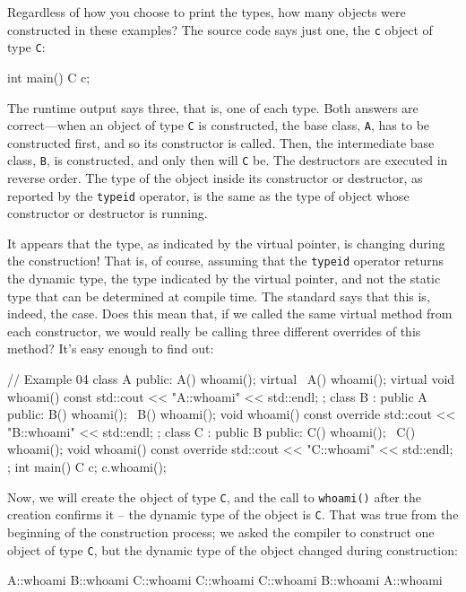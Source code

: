 Regardless of how you choose to print the types, how many objects were constructed in these examples? The source code says just one, the \texttt{c} object of type \texttt{C}:

\begin{code}
int main() {
  C c;
}
\end{code}

The runtime output says three, that is, one of each type. Both answers are correct---when an object of type \texttt{C} is constructed, the base class, \texttt{A}, has to be constructed first, and so its constructor is called. Then, the intermediate base class, \texttt{B}, is constructed, and only then will \texttt{C} be. The destructors are executed in reverse order. The type of the object inside its constructor or destructor, as reported by the \texttt{typeid} operator, is the same as the type of object whose constructor or destructor is running.

It appears that the type, as indicated by the virtual pointer, is changing during the construction! That is, of course, assuming that the \texttt{typeid} operator returns the dynamic type, the type indicated by the virtual pointer, and not the static type that can be determined at compile time. The standard says that this is, indeed, the case. Does this mean that, if we called the same virtual method from each constructor, we would really be calling three different overrides of this method? It's easy enough to find out:

\begin{code}
// Example 04
class A {
  public:
  A() { whoami(); }
  virtual ~A() { whoami(); }
  virtual void whoami() const {
    std::cout << "A::whoami" << std::endl;
  }
};
class B : public A {
  public:
  B() { whoami(); }
  ~B() { whoami(); }
  void whoami() const override {
    std::cout << "B::whoami" << std::endl;
  }
};
class C : public B {
  public:
  C() { whoami(); }
  ~C() { whoami(); }
  void whoami() const override {
    std::cout << "C::whoami" << std::endl;
  }
};
int main() {
  C c;
  c.whoami();
}
\end{code}

Now, we will create the object of type \texttt{C}, and the call to \texttt{whoami()} after the creation confirms it -- the dynamic type of the object is \texttt{C}. That was true from the beginning of the construction process; we asked the compiler to construct one object of type \texttt{C}, but the dynamic type of the object changed during construction:

\begin{code}
A::whoami
B::whoami
C::whoami
C::whoami
C::whoami
B::whoami
A::whoami
\end{code}

